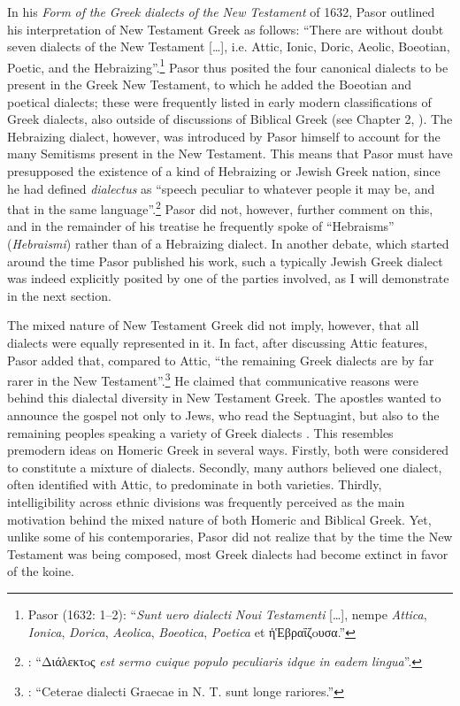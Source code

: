 In his \textit{Form} \textit{of} \textit{the} \textit{Greek} \textit{dialects} \textit{of} \textit{the} \textit{New} \textit{Testament} of 1632, Pasor outlined his interpretation of New Testament Greek as follows: “There are without doubt seven dialects of the New Testament […], i.e. Attic, Ionic, Doric, Aeolic, Boeotian, Poetic, and the Hebraizing”.\footnote{Pasor (1632: 1–2): “\textit{Sunt} \textit{uero} \textit{dialecti} \textit{Noui} \textit{Testamenti} […], nempe \textit{Attica}, \textit{Ionica}, \textit{Dorica}, \textit{Aeolica}, \textit{Boeotica}, \textit{Poetica} et ἡἙβραΐζoυσα.”} Pasor thus posited the four canonical dialects to be present in the Greek New Testament, to which he added the Boeotian and poetical dialects; these were frequently listed in early modern classifications of Greek dialects, also outside of discussions of Biblical Greek (see Chapter 2, ). The Hebraizing dialect, however, was introduced by Pasor himself to account for the many Semitisms present in the New Testament. This means that Pasor must have presupposed the existence of a kind of Hebraizing or Jewish Greek nation, since he had defined \textit{dialectus} as “speech peculiar to whatever people it may be, and that in the same language”.\footnote{\citet[1]{Pasor1632}: “Διάλεκτoς \textit{est} \textit{sermo} \textit{cuique} \textit{populo} \textit{peculiaris} \textit{idque} \textit{in} \textit{eadem} \textit{lingua}”.} Pasor did not, however, further comment on this, and in the remainder of his treatise he frequently spoke of “Hebraisms” (\textit{Hebraismi}) rather than of a Hebraizing dialect. In another debate, which started around the time Pasor published his work, such a typically Jewish Greek dialect was indeed explicitly posited by one of the parties involved, as I will demonstrate in the next section.

The mixed nature of New Testament Greek did not imply, however, that all dialects were equally represented in it. In fact, after discussing Attic features, Pasor added that, compared to Attic, “the remaining Greek dialects are by far rarer in the New Testament”.\footnote{\citet[24]{Pasor1632}: “Ceterae dialecti Graecae in N. T. sunt longe rariores.”} He claimed that communicative reasons were behind this dialectal diversity in New Testament Greek. The apostles wanted to announce the gospel not only to Jews, who read the Septuagint, but also to the remaining peoples speaking a variety of Greek dialects \citep[143]{Pasor1650}. This resembles premodern ideas on Homeric Greek in several ways. Firstly, both were considered to constitute a mixture of dialects. Secondly, many authors believed one dialect, often identified with Attic, to predominate in both varieties. Thirdly, intelligibility across ethnic divisions was frequently perceived as the main motivation behind the mixed nature of both Homeric and Biblical Greek. Yet, unlike some of his contemporaries, Pasor did not realize that by the time the New Testament was being composed, most Greek dialects had become extinct in favor of the koine.


